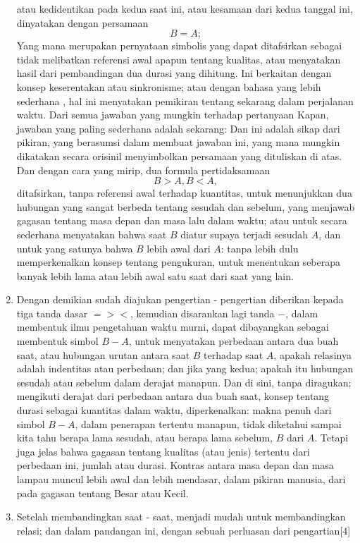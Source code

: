 \documentclass[a4paper, 12pt]{book}
\begin{document}
\begin{enumerate}
atau kedidentikan pada kedua saat ini, atau kesamaan dari kedua tanggal ini, 
dinyatakan dengan persamaan 
\[
B = A;
\]
Yang mana merupakan pernyataan simbolis yang dapat ditafsirkan sebagai
tidak melibatkan referensi awal  apapun tentang kualitas, atau menyatakan
hasil dari pembandingan dua durasi yang dihitung. Ini berkaitan dengan 
konsep keserentakan atau sinkronisme; atau dengan bahasa yang lebih sederhana
, hal ini menyatakan pemikiran tentang sekarang dalam perjalanan waktu. Dari
semua jawaban yang mungkin terhadap pertanyaan Kapan, jawaban yang paling
sederhana adalah sekarang: Dan ini adalah sikap dari pikiran, yang berasumsi
dalam membuat jawaban ini, yang mana mungkin dikatakan secara orisinil 
menyimbolkan persamaan yang dituliskan di atas. Dan dengan cara yang mirip,
dua formula pertidaksamaan
\[
B > A, B < A,
\]
ditafsirkan, tanpa referensi awal terhadap kuantitas, untuk menunjukkan
dua hubungan yang sangat berbeda tentang sesudah dan sebelum, yang menjawab
gagasan tentang masa depan dan masa lalu dalam waktu; atau untuk secara 
sederhana menyatakan bahwa saat $B$ diatur supaya terjadi sesudah $A$, 
dan untuk yang satunya bahwa $B$ lebih awal dari $A$: tanpa lebih dulu 
memperkenalkan konsep tentang pengukuran, untuk menentukan seberapa banyak
lebih lama atau lebih awal satu saat dari saat yang lain.
\item Dengan demikian sudah diajukan pengertian - pengertian diberikan 
kepada tiga tanda dasar $=><$, kemudian disarankan lagi tanda $-$, dalam 
membentuk ilmu pengetahuan waktu murni, dapat dibayangkan sebagai
membentuk simbol $B - A$, untuk menyatakan perbedaan antara dua buah saat,
atau hubungan urutan antara saat $B$ terhadap saat $A$, apakah relasinya
adalah indentitas atau perbedaan; dan jika yang kedua; apakah itu hubungan
sesudah atau sebelum dalam derajat manapun. Dan di sini, tanpa diragukan;
mengikuti derajat dari perbedaan antara dua buah saat, konsep tentang
durasi sebagai kuantitas dalam waktu, diperkenalkan: makna penuh dari
simbol $B-A$, dalam penerapan tertentu manapun, tidak diketahui sampai
kita tahu berapa lama sesudah, atau berapa lama sebelum, $B$ dari $A$.
Tetapi juga jelas bahwa gagasan tentang kualitas (atau jenis) tertentu
dari perbedaan ini, jumlah atau durasi. Kontras antara masa depan dan
masa lampau muncul lebih awal dan lebih mendasar, dalam pikiran manusia,
dari pada gagasan tentang Besar atau Kecil.
\item Setelah membandingkan saat - saat, menjadi mudah untuk membandingkan
relasi; dan dalam pandangan ini, dengan sebuah perluasan dari pengartian[4]

\end{enumerate}
\end{document}
